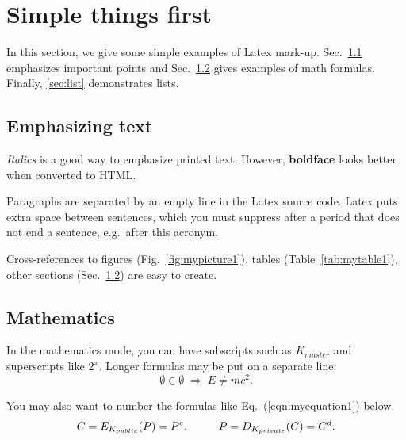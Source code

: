 \documentclass{cseminar}
\begin{document}
\iffalse

\section{Simple things first}

In this section, we give some simple examples of Latex mark-up.
Sec.~\ref{sec:emphasis} emphasizes important points and
Sec.~\ref{sec:math} gives examples of math formulas.
Finally, \ref{sec:list} demonstrates lists.




\subsection{Emphasizing text}
\label{sec:emphasis}

\textit{Italics} is a good way to emphasize printed text. However,
\textbf{boldface} looks better when converted to HTML.

Paragraphs are separated by an empty line in the Latex source code.
Latex puts extra space between sentences, which you must suppress
after a period that does not end a sentence, e.g.\ after this acronym.

Cross-references to figures (Fig.~\ref{fig:mypicture1}), tables
(Table~\ref{tab:mytable1}), other sections (Sec.~\ref{sec:math})
are easy to create. 




\subsection{Mathematics}
\label{sec:math}

In the mathematics mode, you can have subscripts such as $K_{master}$
and superscripts like $2^x$. Longer formulas may be put on a separate
line:
\[ \emptyset \in \emptyset \; \Rightarrow \; E \neq mc^2. \]

You may also want to number the formulas like Eq.~(\ref{eqn:myequation1})
below.
\begin{equation}\label{eqn:myequation1}
C = E_{K_{public}}(P) = P^e. \hspace{10mm}   P = D_{K_{private}}(C) = C^d.
\end{equation}



\end{document}
